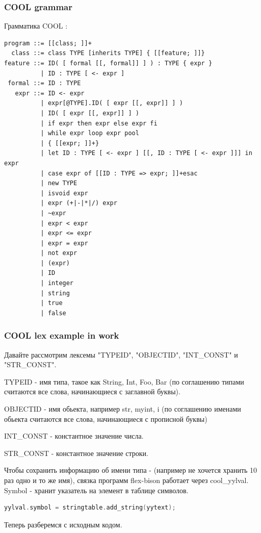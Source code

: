\documentclass[10pt,fullscreen=true, bookmarks=false]{beamer}
\begin{document}
\begin{frame}[fragile]
\frametitle{COOL grammar}

Грамматика COOL :
\begin{lstlisting}[basicstyle=\tiny]
program ::= [[class; ]]+
  class ::= class TYPE [inherits TYPE] { [[feature; ]]}
feature ::= ID( [ formal [[, formal]] ] ) : TYPE { expr }
          | ID : TYPE [ <- expr ]
 formal ::= ID : TYPE
   expr ::= ID <- expr
          | expr[@TYPE].ID( [ expr [[, expr]] ] )
          | ID( [ expr [[, expr]] ] )
          | if expr then expr else expr fi
          | while expr loop expr pool
          | { [[expr; ]]+}
          | let ID : TYPE [ <- expr ] [[, ID : TYPE [ <- expr ]]] in expr
          | case expr of [[ID : TYPE => expr; ]]+esac
          | new TYPE
          | isvoid expr
          | expr (+|-|*|/) expr
          | ~expr
          | expr < expr
          | expr <= expr
          | expr = expr
          | not expr
          | (expr)
          | ID
          | integer
          | string
          | true
          | false
\end{lstlisting}

\tableofcontents[pausesections]
\end{frame}




\begin{frame}[fragile]
\frametitle{COOL lex example in work}

Давайте рассмотрим лексемы "TYPEID", "OBJECTID", "INT\_CONST" и "STR\_CONST".

TYPEID - имя типа, такое как String, Int, Foo, Bar (по соглашению типами считаются все слова, начинающиеся с заглавной буквы).

OBJECTID - имя обьекта, например str, myint, i (по соглашению именами обьекта считаются все слова, начинающиеся с прописной буквы)

INT\_CONST - константное значение числа.

STR\_CONST - константное значение строки.

Чтобы сохранить информацию об имени типа - (например не хочется хранить 10 раз одно и то же имя), связка программ flex-bison работает через cool\_yylval. Symbol - хранит указатель на элемент в таблице символов.

\begin{lstlisting}[language=C++,breaklines]
yylval.symbol = stringtable.add_string(yytext);
\end{lstlisting}


Теперь разберемся с исходным кодом.

\tableofcontents[pausesections]
\end{frame}
\end{document}
